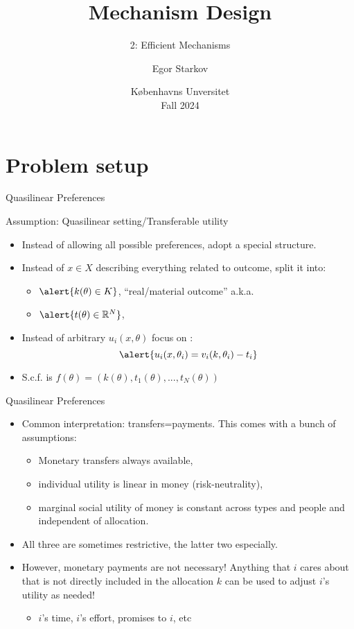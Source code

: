 \documentclass[english,10pt
,aspectratio=169
]{beamer}
\title{Mechanism Design}
\subtitle{2: Efficient Mechanisms}
\author{Egor Starkov}
\date{K{\o}benhavns Unversitet \\
	Fall 2024}
\begin{document}
	\frame[plain]{\titlepage}



\section{Problem setup}

\begin{frame}{Quasilinear Preferences}
	\begin{alertblock}{Assumption: Quasilinear setting/Transferable utility}
		\begin{itemize}
			\item Instead of allowing all possible preferences, adopt a special structure.
			\item Instead of $x \in X$ describing everything related to outcome, split it into:
			\begin{itemize}
				\item $\alert{k(\theta) \in K}$, ``real/material outcome'' a.k.a. 
				\item $\alert{t(\theta) \in \mathbb{R}^N}$, 
			\end{itemize}
			\item Instead of arbitrary $u_i(x,\theta)$ focus on :
			$$\alert{ u_i(x,\theta_i) = v_i(k,\theta_i) - t_i }$$
			\vspace{-1em}
			\item S.c.f. is $f(\theta) = \left( k(\theta), t_1(\theta), ..., t_N(\theta) \right)$
		\end{itemize}
	\end{alertblock}
\end{frame}


\begin{frame}{Quasilinear Preferences}
\begin{itemize}
	\item Common interpretation: transfers=payments. This comes with a bunch of assumptions:
	\begin{itemize}
		\item Monetary transfers always available,
		\item individual utility is linear in money (risk-neutrality),
		\item marginal social utility of money is constant across types and people and independent of allocation.
	\end{itemize}
	\item All three are sometimes restrictive, the latter two especially. 
	\item However, monetary payments are not necessary! Anything that $i$ cares about that is not directly included in the allocation $k$ can be used to adjust $i$'s utility as needed!
	\begin{itemize}
		\item $i$'s time, $i$'s effort, promises to $i$, etc
	\end{itemize}
\end{itemize}
\end{frame}
\end{document}

